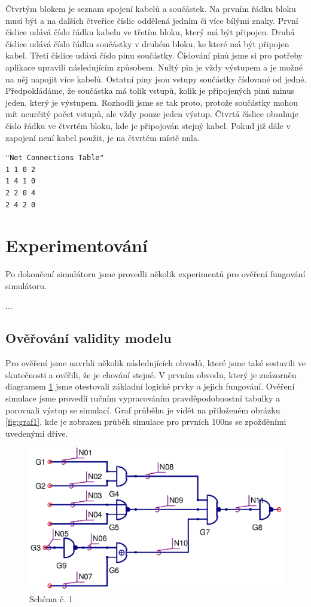 \documentclass[11pt,a4paper]{article}
\begin{document}
			Čtvrtým blokem je seznam spojení kabelů a součástek. Na prvním řádku bloku musí být  a na dalších čtveřice číslic oddělená jedním či více bílými znaky. První číslice udává číslo řádku kabelu ve třetím bloku, který má být připojen. Druhá číslice udává číslo řádku součástky v druhém bloku, ke které má být připojen kabel. Třetí číslice udává číslo pinu součástky. Číslování pinů jsme si pro potřeby aplikace upravili následujícím způsobem. Nultý pin je vždy výstupem a je možné na něj napojit více kabelů. Ostatní piny jsou vstupy součástky číslované od jedné. Předpokládáme, že součástka má tolik vstupů, kolik je připojených pinů minus jeden, který je výstupem. Rozhodli jsme se tak proto, protože součástky mohou mít neurčitý počet vstupů, ale vždy pouze jeden výstup. Čtvrtá číslice obsahuje číslo řádku ve čtvrtém bloku, kde je připojován stejný kabel. Pokud již dále v zapojení není kabel použit, je na čtvrtém místě nula.

\begin{lstlisting}[caption=Příklad bloku propojení]
"Net Connections Table"
1 1 0 2
1 4 1 0
2 2 0 4
2 4 2 0
\end{lstlisting}


	\section{Experimentování}
		Po dokončení simulátoru jsme provedli několik experimentů pro ověření fungování simulátoru.

		...

		\subsection{Ověřování validity modelu}
			\label{validity}
			Pro ověření jsme navrhli několik následujících obvodů, které jsme také sestavili ve skutečnosti a ověřili, že je chování stejné. V prvním obvodu, který je znázorněn diagramem \ref{fig:scheme1} jsme otestovali základní logické prvky a jejich fungování. Ověření simulace jsme provedli ručním vypracováním pravděpodobnostní tabulky a porovnali výstup se simulací. Graf průběhu je vidět na přiloženém obrázku \ref{fig:graf1}, kde je zobrazen průběh simulace pro prvních 100ns se zpožděními uvedenými dříve.


			\begin{figure}[!htb]
				\centering
					\includegraphics[scale=.7]{input1.eps}
					\caption{Schéma č. 1}
					\label{fig:scheme1}
			\end{figure}
\end{document}
